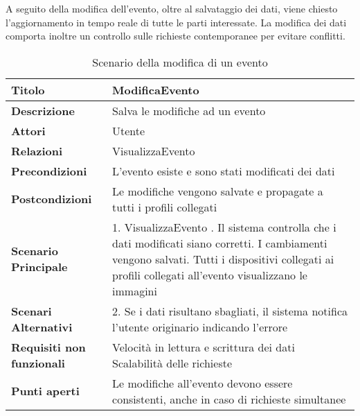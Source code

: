 \clearpage

A seguito della modifica dell'evento, oltre al salvataggio dei dati, viene chiesto l'aggiornamento in tempo reale di tutte le parti interessate.
La modifica dei dati comporta inoltre un controllo sulle richieste contemporanee per evitare conflitti.\\
\begin{table}[htb]
    \begin{tabular} {|P{4.5cm}|P{11cm}|}
        \hline
        \textbf{Titolo}                   & ModificaEvento                                                                               \\
        \hline
        \textbf{Descrizione}              & Salva le modifiche ad un evento                                                              \\
        \hline
        \textbf{Attori}                   & Utente                                                                                       \\
        \hline
        \textbf{Relazioni}                & VisualizzaEvento                                                                             \\
        \hline
        \textbf{Precondizioni}            & L'evento esiste e sono stati modificati dei dati                                             \\
        \hline
        \textbf{Postcondizioni}           & Le modifiche vengono salvate e propagate a tutti i profili collegati                         \\
        \hline
        \textbf{Scenario Principale}      & 1. VisualizzaEvento . Il sistema controlla che i dati modificati siano corretti. I cambiamenti vengono salvati. Tutti i dispositivi collegati ai profili collegati all'evento visualizzano le immagini                                        \\
        \hline
        \textbf{Scenari Alternativi}      & 2. Se i dati risultano sbagliati, il sistema notifica l'utente originario indicando l'errore \\
        \hline
        \textbf{Requisiti non funzionali} & Velocità in lettura e scrittura dei dati \newline
        Scalabilità delle richieste                                                                                                      \\
        \hline
        \textbf{Punti aperti}             & Le modifiche all'evento devono essere consistenti, anche in caso di richieste simultanee     \\
        \hline
    \end{tabular}
    \caption{Scenario della modifica di un evento}
\end{table}

